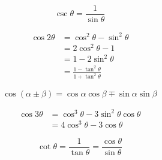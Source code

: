 






\[\begin{equation} \csc \theta = \frac{1}{\sin \theta} \end{equation}\]

\[\begin{align} \cos 2\theta &= \cos^2 \theta - \sin^2 \theta \\\ &= 2 \cos^2 \theta - 1 \\\ &= 1 - 2 \sin^2 \theta \\\ &= \frac{1 - \tan^2 \theta} {1 + \tan^2 \theta} \end{align}\]

\[\begin{equation} \cos(\alpha \pm \beta) = \cos \alpha \cos \beta \mp \sin \alpha \sin \beta \end{equation}\]

\[\begin{align}\cos 3\theta & = \cos^3\theta - 3 \sin^2 \theta\cos \theta \\\ & = 4 \cos^3\theta - 3 \cos\theta\end{align}\]

\[\begin{equation} \cot \theta = \frac{1}{\tan \theta} = \frac{\cos \theta}{\sin \theta} \end{equation}\]

